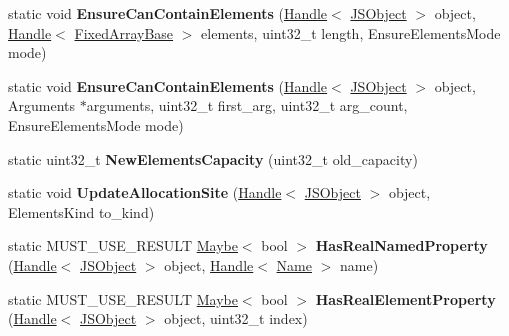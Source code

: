 \begin{DoxyCompactItemize}
\item 
static void {\bfseries Ensure\+Can\+Contain\+Elements} (\hyperlink{classv8_1_1internal_1_1_handle}{Handle}$<$ \hyperlink{classv8_1_1internal_1_1_j_s_object}{J\+S\+Object} $>$ object, \hyperlink{classv8_1_1internal_1_1_handle}{Handle}$<$ \hyperlink{classv8_1_1internal_1_1_fixed_array_base}{Fixed\+Array\+Base} $>$ elements, uint32\+\_\+t length, Ensure\+Elements\+Mode mode)\hypertarget{classv8_1_1internal_1_1_j_s_object_ab287ab1b3b49b1d237ba1a8598997148}{}\label{classv8_1_1internal_1_1_j_s_object_ab287ab1b3b49b1d237ba1a8598997148}

\item 
static void {\bfseries Ensure\+Can\+Contain\+Elements} (\hyperlink{classv8_1_1internal_1_1_handle}{Handle}$<$ \hyperlink{classv8_1_1internal_1_1_j_s_object}{J\+S\+Object} $>$ object, Arguments $\ast$arguments, uint32\+\_\+t first\+\_\+arg, uint32\+\_\+t arg\+\_\+count, Ensure\+Elements\+Mode mode)\hypertarget{classv8_1_1internal_1_1_j_s_object_a4cf79e36cdbb1e7fe97389ba3938bdf2}{}\label{classv8_1_1internal_1_1_j_s_object_a4cf79e36cdbb1e7fe97389ba3938bdf2}

\item 
static uint32\+\_\+t {\bfseries New\+Elements\+Capacity} (uint32\+\_\+t old\+\_\+capacity)\hypertarget{classv8_1_1internal_1_1_j_s_object_ada94874ea21d5c573bf0fb4915bc346e}{}\label{classv8_1_1internal_1_1_j_s_object_ada94874ea21d5c573bf0fb4915bc346e}

\item 
static void {\bfseries Update\+Allocation\+Site} (\hyperlink{classv8_1_1internal_1_1_handle}{Handle}$<$ \hyperlink{classv8_1_1internal_1_1_j_s_object}{J\+S\+Object} $>$ object, Elements\+Kind to\+\_\+kind)\hypertarget{classv8_1_1internal_1_1_j_s_object_a423fd13628882c252af12eb2b61f0d3a}{}\label{classv8_1_1internal_1_1_j_s_object_a423fd13628882c252af12eb2b61f0d3a}

\item 
static M\+U\+S\+T\+\_\+\+U\+S\+E\+\_\+\+R\+E\+S\+U\+LT \hyperlink{classv8_1_1_maybe}{Maybe}$<$ bool $>$ {\bfseries Has\+Real\+Named\+Property} (\hyperlink{classv8_1_1internal_1_1_handle}{Handle}$<$ \hyperlink{classv8_1_1internal_1_1_j_s_object}{J\+S\+Object} $>$ object, \hyperlink{classv8_1_1internal_1_1_handle}{Handle}$<$ \hyperlink{classv8_1_1internal_1_1_name}{Name} $>$ name)\hypertarget{classv8_1_1internal_1_1_j_s_object_ae40588a8058db20241314b10b8bf315d}{}\label{classv8_1_1internal_1_1_j_s_object_ae40588a8058db20241314b10b8bf315d}

\item 
static M\+U\+S\+T\+\_\+\+U\+S\+E\+\_\+\+R\+E\+S\+U\+LT \hyperlink{classv8_1_1_maybe}{Maybe}$<$ bool $>$ {\bfseries Has\+Real\+Element\+Property} (\hyperlink{classv8_1_1internal_1_1_handle}{Handle}$<$ \hyperlink{classv8_1_1internal_1_1_j_s_object}{J\+S\+Object} $>$ object, uint32\+\_\+t index)\hypertarget{classv8_1_1internal_1_1_j_s_object_a792d09543dde95abe7b8c1b8d555d9e5}{}\label{classv8_1_1internal_1_1_j_s_object_a792d09543dde95abe7b8c1b8d555d9e5}


\end{DoxyCompactItemize}
